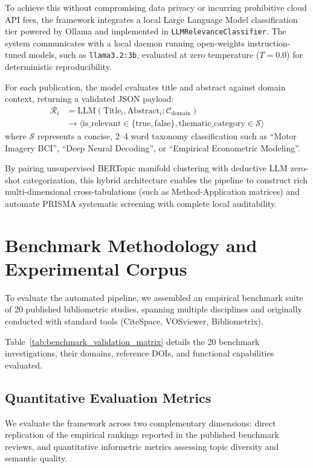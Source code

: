\documentclass[preprint,12pt]{elsarticle}
\begin{document}
To achieve this without compromising data privacy or incurring prohibitive cloud API fees, the framework integrates a local Large Language Model classification tier powered by Ollama and implemented in \texttt{LLMRelevanceClassifier}. The system communicates with a local daemon running open-weights instruction-tuned models, such as \texttt{llama3.2:3b}, evaluated at zero temperature ($T=0.0$) for deterministic reproducibility.

For each publication, the model evaluates title and abstract against domain context, returning a validated JSON payload:
\begin{align}
\mathcal{R}_i &= \text{LLM}(\text{Title}_i, \text{Abstract}_i; \mathcal{C}_{\text{domain}}) \nonumber \\
&\rightarrow \langle \text{is\_relevant} \in \{\text{true}, \text{false}\}, \text{thematic\_category} \in \mathcal{S} \rangle
\end{align}
where $\mathcal{S}$ represents a concise, 2--4 word taxonomy classification such as ``Motor Imagery BCI'', ``Deep Neural Decoding'', or ``Empirical Econometric Modeling''. 

By pairing unsupervised BERTopic manifold clustering with deductive LLM zero-shot categorization, this hybrid architecture enables the pipeline to construct rich multi-dimensional cross-tabulations (such as Method-Application matrices) and automate PRISMA systematic screening with complete local auditability.

\section{Benchmark Methodology and Experimental Corpus}
\label{sec:benchmark_design}
To  evaluate the automated pipeline, we assembled an empirical benchmark suite of 20 published bibliometric studies, spanning multiple disciplines and originally conducted with standard tools (CiteSpace, VOSviewer, Bibliometrix). 

Table~\ref{tab:benchmark_validation_matrix} details the 20 benchmark investigations, their domains, reference DOIs, and functional capabilities evaluated.



\subsection{Quantitative Evaluation Metrics}
We evaluate the framework across two complementary dimensions: direct replication of the empirical rankings reported in the published benchmark reviews, and quantitative informetric metrics assessing topic diversity and semantic quality.
\end{document}
